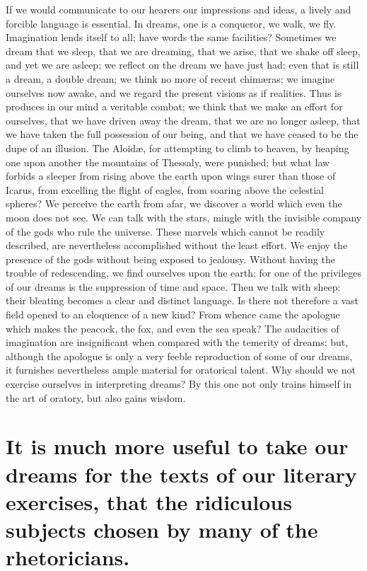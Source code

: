 \documentclass[12pt]{article}
\begin{document}
If we would communicate to our hearers our impressions and ideas, a lively and
forcible language is essential. In dreams, one is a conqueror, we walk, we fly.
Imagination lends itself to all; have words the same facilities? Sometimes we
dream that we sleep, that we are dreaming, that we arise, that we shake off
sleep, and yet we are asleep; we reflect on the dream we have just had; even
that is still a dream, a double dream; we think no more of recent chim{\ae}ras;
we imagine ourselves now awake, and we regard the present visions as if
realities. Thus is produces in our mind a veritable combat; we think that we
make an effort for ourselves, that we have driven away the dream, that we are
no longer asleep, that we have taken the full possession of our being, and that
we have ceased to be the dupe of an illusion. The Aloid{\ae}, for attempting to
climb to heaven, by heaping one upon another the mountains of Thessaly, were
punished; but what law forbids a sleeper from rising above the earth upon wings
surer than those of Icarus, from excelling the flight of eagles, from soaring
above the celestial spheres? We perceive the earth from afar, we discover a
world which even the moon does not see. We can talk with the stars, mingle with
the invisible company of the gods who rule the universe. These marvels which
cannot be readily described, are nevertheless accomplished without the least
effort. We enjoy the presence of the gods without being exposed to jealousy.
Without having the trouble of redescending, we find ourselves upon the earth;
for one of the privileges of our dreams is the suppression of time and space.
Then we talk with sheep: their bleating becomes a clear and distinct language.
Is there not therefore a vast field opened to an eloquence of a new kind? From
whence came the apologue which makes the peacock, the fox, and even the sea
speak? The audacities of imagination are insignificant when compared with the
temerity of dreams; but, although the apologue is only a very feeble
reproduction of some of our dreams, it furnishes nevertheless ample material
for oratorical talent. Why should we not exercise ourselves in interpreting
dreams? By this one not only trains himself in the art of oratory, but also
gains wisdom.


\section{It is much more useful to take our dreams for the texts of our
literary exercises, that the ri\-dic\-u\-lous subjects chosen by many of the
rhetoricians.}
\end{document}

